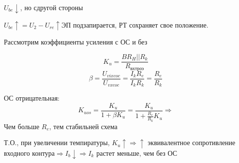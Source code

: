 $U_{be}\downarrow$, но  сдругой стороны

$U_{be}\uparrow=U_2-U_{re}\uparrow$ЭП подзапирается, РТ сохраняет свое положение.

Рассмотрим коэффициенты усиления с ОС и без

$$
K_u=\frac{BR_H||R_k}{R_{вхтроэ}}$$
$$
\beta=\frac{U_{vixcoc}}{U_{vxcoc}}=\frac{I_kR_e}{I_kR_k}=\frac{R_e}{R_k}
$$

ОС отрицательная:
$$
K_{uos}=\frac{K_u}{1+\beta K_u}=\frac{K_u}{1+\frac{R_e}{R_k} K_u}\Rightarrow
$$
Чем больше $R_e$, тем стабильней схема

Т.О., при увеличении темпиратуры, $K_u\uparrow\Rightarrow\uparrow$ эквивалентное сопротивление входного контура$\Rightarrow I_b\downarrow\Rightarrow I_k$ растет меньше, чем без ОС
